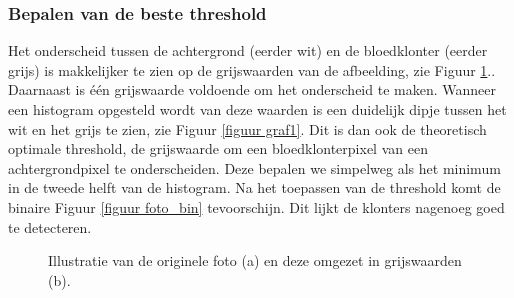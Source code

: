 \documentclass[a4paper,kulak]{kulakarticle}
\begin{document}
\subsubsection{Bepalen van de beste threshold}
Het onderscheid tussen de achtergrond (eerder wit) en de bloedklonter (eerder grijs) is makkelijker te zien op de grijswaarden van de afbeelding, zie Figuur \ref{figuur beste_threshold}.. Daarnaast is één grijswaarde voldoende om het onderscheid te maken. Wanneer een histogram opgesteld wordt van deze waarden is een duidelijk dipje tussen het wit en het grijs te zien, zie Figuur \ref{figuur graf1}. Dit is dan ook de theoretisch optimale threshold, de grijswaarde om een bloedklonterpixel van een achtergrondpixel te onderscheiden. Deze bepalen we simpelweg als het minimum in de tweede helft van de histogram. Na het toepassen van de threshold komt de binaire Figuur \ref{figuur foto_bin} tevoorschijn. Dit lijkt de klonters nagenoeg goed te detecteren.

\begin{figure}[H]
	\centering
	\qquad
	
	\caption{Illustratie van de originele foto (a) en deze omgezet in grijswaarden (b).}
	\label{figuur beste_threshold}
\end{figure}
\end{document}
